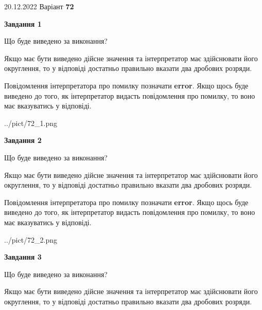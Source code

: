 \documentclass[12pt, ukrainian]{article}
\begin{document}
{20.12.2022 Варіант \No \textbf { 72 }\par}
{
\begin {Large}

{\begin {center}\textbf{Завдання 1}\end {center}}\par
Що буде виведено за виконання? \par

Якщо має бути виведено дійсне значення та інтерпретатор має здійснювати його округлення, 
то у відповіді достатньо правильно вказати два дробових розряди.

Повідомлення інтерпретатора про помилку позначати \textbf{error}.
Якщо щось буде виведено до того, як інтерпретатор видасть повідомлення про помилку, 
то воно має вказуватись у відповіді. \par

\begin{center}
	{../pict/72_1.png}
\end{center}
\newpage

{\begin {center}\textbf{Завдання 2}\end {center}}\par
Що буде виведено за виконання? \par

Якщо має бути виведено дійсне значення та інтерпретатор має здійснювати його округлення, 
то у відповіді достатньо правильно вказати два дробових розряди.

Повідомлення інтерпретатора про помилку позначати \textbf{error}.
Якщо щось буде виведено до того, як інтерпретатор видасть повідомлення про помилку, 
то воно має вказуватись у відповіді. \par

\begin{center}
	{../pict/72_2.png}
\end{center}
\newpage

{\begin {center}\textbf{Завдання 3}\end {center}}\par
Що буде виведено за виконання? \par

Якщо має бути виведено дійсне значення та інтерпретатор має здійснювати його округлення, 
то у відповіді достатньо правильно вказати два дробових розряди.


\end{Large}}
\end{document}
